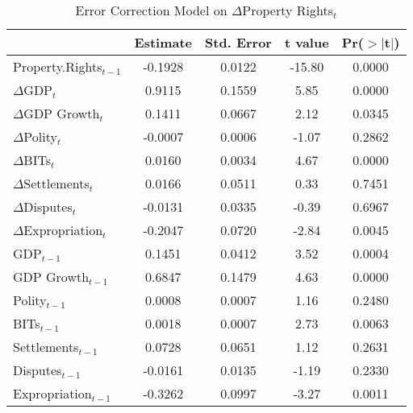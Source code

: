 \begin{table}[ht]
\centering
\label{tab:proprights}
\caption{Error Correction Model on $\Delta$Property Rights$_{t}$}
\begin{tabular}{lcccc}
  \hline\hline
 & Estimate & Std. Error & t value & Pr($>$$|$t$|$) \\ 
  \hline
Property.Rights$_{t-1}$ & -0.1928 & 0.0122 & -15.80 & 0.0000 \\ 
\hline
  $\Delta$GDP$_{t}$ & 0.9115 & 0.1559 & 5.85 & 0.0000 \\ 
  $\Delta$GDP Growth$_{t}$ & 0.1411 & 0.0667 & 2.12 & 0.0345 \\ 
  $\Delta$Polity$_{t}$ & -0.0007 & 0.0006 & -1.07 & 0.2862 \\ 
  $\Delta$BITs$_{t}$ & 0.0160 & 0.0034 & 4.67 & 0.0000 \\ 
  $\Delta$Settlements$_{t}$ & 0.0166 & 0.0511 & 0.33 & 0.7451 \\ 
  $\Delta$Disputes$_{t}$ & -0.0131 & 0.0335 & -0.39 & 0.6967 \\ 
  $\Delta$Expropriation$_{t}$ & -0.2047 & 0.0720 & -2.84 & 0.0045 \\ 
  \hline
  GDP$_{t-1}$ & 0.1451 & 0.0412 & 3.52 & 0.0004 \\ 
  GDP Growth$_{t-1}$ & 0.6847 & 0.1479 & 4.63 & 0.0000 \\ 
  Polity$_{t-1}$ & 0.0008 & 0.0007 & 1.16 & 0.2480 \\ 
  BITs$_{t-1}$ & 0.0018 & 0.0007 & 2.73 & 0.0063 \\ 
  Settlements$_{t-1}$ & 0.0728 & 0.0651 & 1.12 & 0.2631 \\ 
  Disputes$_{t-1}$ & -0.0161 & 0.0135 & -1.19 & 0.2330 \\ 
  Expropriation$_{t-1}$ & -0.3262 & 0.0997 & -3.27 & 0.0011 \\ 
   \hline\hline
\end{tabular}
\end{table}